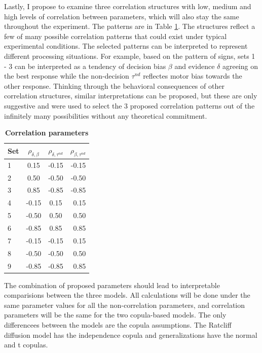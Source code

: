 \documentclass[12pt]{report}
\begin{document}
Lastly, I propose to examine three correlation structures with low, medium and high levels of correlation between parameters, which will also stay the same throughout the experiment. The patterns are in Table \ref{tab:corr}. The structures reflect a few of many possible correlation patterns that could exist
under typical experimental conditions. The selected patterns can be interpreted to represent different processing situations. For example, based on the pattern of signs, sets 1 - 3 can be interpreted as a tendency of decision bias $\beta$ and evidence $\delta$ agreeing on the best response while the non-decision $\tau^{nd}$ reflectes motor bias towards the other response. Thinking through the behavioral consequences of other correlation structures, similar interpretations can be proposed, but these are only suggestive and were used to select the 3 proposed correlation patterns out of the infinitely many possibilities without any theoretical commitment.
%
\begin{table}[H]
\centering
\begin{tabular}{|l|c|c|r|}
\hline
Set & $\rho_{\delta,\beta}$ & $\rho_{\delta,\tau^{nd}}$ & $\rho_{\beta,\tau^{nd}}$ \\ \hline
1 & 0.15 & -0.15 & -0.15 \\ \hline
2 & 0.50 & -0.50 & -0.50 \\ \hline
3 & 0.85 & -0.85 & -0.85 \\ \hline
4 & -0.15 & 0.15 & 0.15 \\ \hline
5 & -0.50 & 0.50 & 0.50 \\ \hline
6 & -0.85 & 0.85 & 0.85 \\ \hline
7 & -0.15 & -0.15 & 0.15 \\ \hline
8 & -0.50 & -0.50 & 0.50 \\ \hline
9 & -0.85 & -0.85 & 0.85 \\ \hline
\end{tabular}
\caption{\label{tab:corr} \textbf{Correlation parameters}}
\end{table}
%

The combination of proposed parameters should lead to interpretable comparisions between the three models. All calculations will be done under the same parameter values for all the non-correlation parameters, and correlation parameters will be the same for the two copula-based models. The only differencees between the models are the copula assumptions. The Ratcliff diffusion model has the independence copula and generalizations have the normal and t copulas. 
\end{document}
